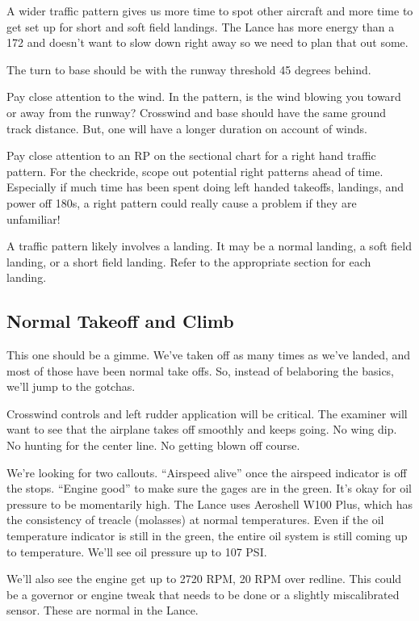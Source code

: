 A wider traffic pattern gives us more time to spot other aircraft and more time to get set up for short and soft field landings. The Lance has more energy than a 172 and doesn't want to slow down right away so we need to plan that out some.

The turn to base should be with the runway threshold 45 degrees behind.

Pay close attention to the wind. In the pattern, is the wind blowing you toward or away from the runway? Crosswind and base should have the same ground track distance. But, one will have a longer duration on account of winds.

Pay close attention to an RP on the sectional chart for a right hand traffic pattern. For the checkride, scope out potential right patterns ahead of time. Especially if much time has been spent doing left handed takeoffs, landings, and power off 180s, a right pattern could really cause a problem if they are unfamiliar!

A traffic pattern likely involves a landing. It may be a normal landing, a soft field landing, or a short field landing. Refer to the appropriate section for each landing.

\subsection{Normal Takeoff and Climb}

This one should be a gimme. We've taken off as many times as we've landed, and most of those have been normal take offs. So, instead of belaboring the basics, we'll jump to the gotchas.

Crosswind controls and left rudder application will be critical. The examiner will want to see that the airplane takes off smoothly and keeps going. No wing dip. No hunting for the center line. No getting blown off course.

We're looking for two callouts. ``Airspeed alive'' once the airspeed indicator is off the stops. ``Engine good'' to make sure the gages are in the green. It's okay for oil pressure to be momentarily high. The Lance uses Aeroshell W100 Plus, which has the consistency of treacle (molasses) at normal temperatures. Even if the oil temperature indicator is still in the green, the entire oil system is still coming up to temperature. We'll see oil pressure up to 107 PSI.

We'll also see the engine get up to 2720 RPM, 20 RPM over redline. This could be a governor or engine tweak that needs to be done or a slightly miscalibrated sensor. These are normal in the Lance.

